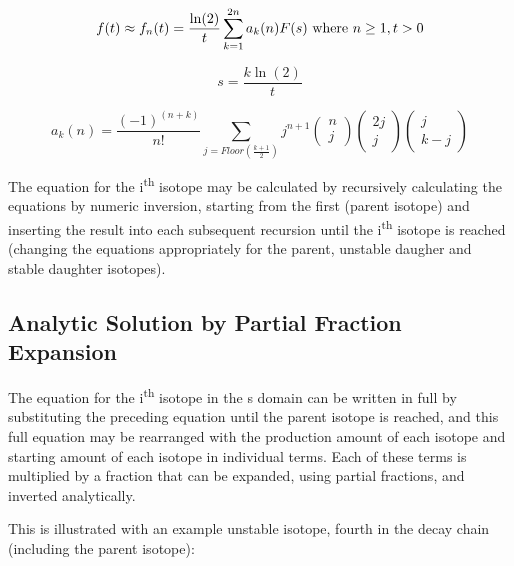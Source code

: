 \documentclass[12pt,twoside]{manual}
\begin{document}
\begin{equation}
f(t) \approx f_{n}(t) = \frac{\ln(2)}{t} \sum_{k=1}^{2n} a_{k}(n)F(s) \textnormal{ where } n \ge 1, t>0
\end{equation}

\begin{equation}
s = \frac{k \ln(2)}{t}
\end{equation}

\begin{equation}
a_{k}(n) = \frac{(-1)^{(n+k)}}{n!} \sum_{j=Floor(\frac{k+1}{2})} j^{n+1} \left( \begin{matrix} n \\ j \end{matrix} \right)  \left( \begin{matrix} 2j \\ j \end{matrix} \right)  \left( \begin{matrix} j \\ k-j \end{matrix} \right)
\end{equation}

The equation for the i\textsuperscript{th} isotope may be calculated by recursively calculating the equations by numeric inversion, starting from the first (parent isotope) and inserting the result into each subsequent recursion until the i\textsuperscript{th} isotope is reached (changing the equations appropriately for the parent, unstable daugher and stable daughter isotopes).


\subsection{Analytic Solution by Partial Fraction Expansion}

The equation for the i\textsuperscript{th} isotope in the s domain can be written in full by substituting the preceding equation until the parent isotope is reached, and this full equation may be rearranged with the production amount of each isotope and starting amount of each isotope in individual terms.  Each of these terms is multiplied by a fraction that can be expanded, using partial fractions, and inverted analytically.

This is illustrated with an example unstable isotope, fourth in the decay chain (including the parent isotope):
\end{document}
